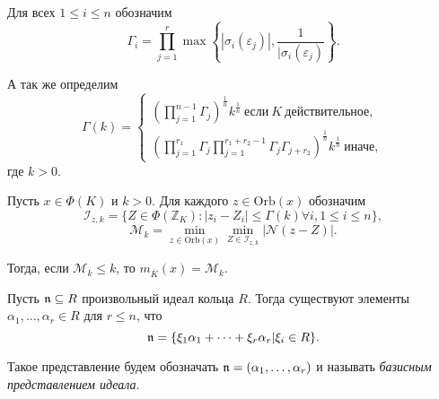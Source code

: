 \documentclass[_00_autoref.tex]{subfiles}
\begin{document}
\begin{definition}
    Для всех $1 \le i \le n$ обозначим
    \begin{equation*}
        \Gamma_i = \prod\limits_{j=1}^r \max\left\{
            |\sigma_i(\varepsilon_j)|, \frac{1}{|\sigma_i(\varepsilon_j)}
        \right\}.
    \end{equation*}

    А так же определим
    \begin{equation*}
        \Gamma(k) =
        \begin{cases}
            \left(
                \prod\limits_{j=1}^{n-1} \Gamma_j
            \right)^{\frac{1}{n}} k^{\frac{1}{n}}\ \textrm{если}\ K\ \textrm{действительное},\\
            \left(
                \prod\limits_{j=1}^{r_1} \Gamma_j \prod\limits_{j=1}^{r_1+r_2-1} \Gamma_j \Gamma_{j+r_2}
            \right)^{\frac{1}{n}} k^{\frac{1}{n}}\ \textrm{иначе},
        \end{cases}
    \end{equation*}
    где $k>0$.
\end{definition}

\begin{statement}\label{proposition:division_with_least_norm_remainder}
    Пусть $x \in \Phi(K)$ и $k > 0$.
    Для каждого $z \in \textrm{Orb}(x)$ обозначим
    \begin{equation*}
        \mathcal{I}_{z, k} = \{Z \in \Phi(\mathbb{Z}_K): |z_i-Z_i| \le \Gamma(k) \forall i, 1 \le i \le n\},
    \end{equation*}
    \begin{equation*}
        \mathcal{M}_k = \min\limits_{z \in \textrm{Orb}(x)} \min\limits_{Z \in \mathcal{I}_{z, k}} |\mathcal{N}(z-Z)|.
    \end{equation*}

    Тогда, если $\mathcal{M}_k \le k$, то $m_{\overline{K}}(x) = \mathcal{M}_k$.
\end{statement}

\begin{definition}
    Пусть $\mathfrak{n} \subseteq R$ произвольный идеал кольца $R$.
    Тогда существуют элементы $\alpha_1, \dots, \alpha_r \in R$ для $r \leq n$, что
    \begin{equation*}
        \mathfrak{n} = \{\xi_1 \alpha_1 + \dots + \xi_r \alpha_r | \xi_i \in R\}.
    \end{equation*}
    
    Такое представление будем обозначать $\mathfrak{n} = (\alpha_1, \dots, \alpha_r)$ и называть \emph{базисным представлением идеала}.
\end{definition}
\end{document}
